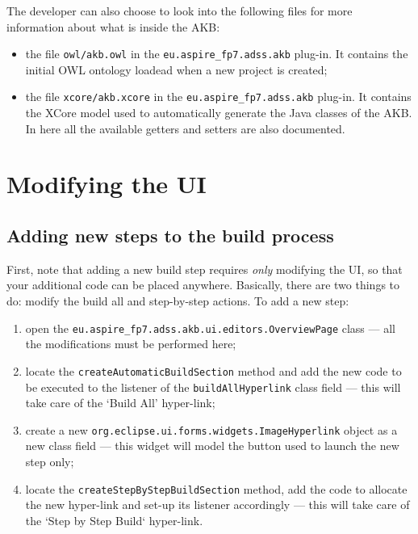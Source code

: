 \documentclass{memoir}
\newcommand{\PlugIn}[1]{\texttt{#1}}
\newcommand{\Method}[1]{\texttt{#1}}
\newcommand{\Class}[1]{\texttt{#1}}
\newcommand{\File}[1]{\texttt{#1}}
\newcommand{\Object}[1]{\texttt{#1}}
\begin{document}
	The developer can also choose to look into the following files for more information about what is inside the AKB:
	
	\begin{itemize}
		\item the file \File{owl/akb.owl} in the \PlugIn{eu.aspire\_fp7.adss.akb} plug-in. It contains the initial OWL ontology loadead when a new project is created;
		\item the file \File{xcore/akb.xcore} in the \PlugIn{eu.aspire\_fp7.adss.akb} plug-in. It contains the XCore model used to automatically generate the Java classes of the AKB. In here all the available getters and setters are also documented.
	\end{itemize}
	

	\chapter{Modifying the UI}

	\section{Adding new steps to the build process}
	
	First, note that adding a new build step requires \emph{only} modifying the UI, so that your additional code can be placed anywhere. Basically, there are two things to do: modify the build all and step-by-step actions. To add a new step:
	
	\begin{enumerate}
		\item open the \Class{eu.aspire\_fp7.adss.akb.ui.editors.OverviewPage} class --- all the modifications must be performed here;
		\item locate the \Method{createAutomaticBuildSection} method and add the new code to be executed to the listener of the \Object{buildAllHyperlink} class field --- this will take care of the `Build All' hyper-link;
		\item create a new \Class{org.eclipse.ui.forms.widgets.ImageHyperlink} object as a new class field --- this widget will model the button used to launch the new step only;
		\item locate the \Method{createStepByStepBuildSection} method, add the code to allocate the new hyper-link and set-up its listener accordingly --- this will take care of the `Step by Step Build` hyper-link.
	\end{enumerate}
\end{document}
